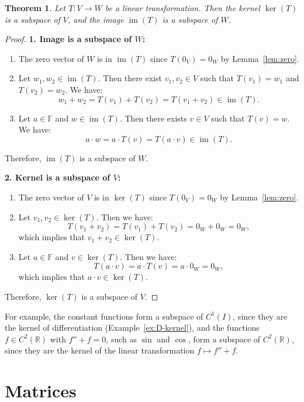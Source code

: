 \documentclass[11pt]{article}
\theoremstyle{definition}
\theoremstyle{plain}
\newtheorem{theorem}[definition]{Theorem}
\theoremstyle{remark}
\DeclareMathOperator{\im}{im}
\begin{document}
\begin{theorem}\label{thm:kerim}
    Let $T: V \to W$ be a linear transformation. Then the kernel $\ker(T)$ is a subspace of $V$, and the image $\im(T)$ is a subspace of $W$.
\end{theorem}

\begin{proof}
    \textbf{1. Image is a subspace of $W$:}
    \begin{enumerate}
        \item The zero vector of $W$ is in $\im(T)$ since $T(0_V) = 0_W$ by Lemma~\ref{lem:zero}.
        \item Let $w_1, w_2 \in \im(T)$. Then there exist $v_1, v_2 \in V$ such that $T(v_1) = w_1$ and $T(v_2) = w_2$. We have:
        \[w_1 + w_2 = T(v_1) + T(v_2) = T(v_1 + v_2) \in \im(T).\]
        \item Let $a \in \mathbb{F}$ and $w \in \im(T)$. Then there exists $v \in V$ such that $T(v) = w$. We have:
        \[a \cdot w = a \cdot T(v) = T(a \cdot v) \in \im(T).\]
    \end{enumerate}
    Therefore, $\im(T)$ is a subspace of $W$.

    \textbf{2. Kernel is a subspace of $V$:}
    \begin{enumerate}
        \item The zero vector of $V$ is in $\ker(T)$ since $T(0_V) = 0_W$ by Lemma~\ref{lem:zero}.
        \item Let $v_1, v_2 \in \ker(T)$. Then we have:
        \[T(v_1 + v_2) = T(v_1) + T(v_2) = 0_W + 0_W = 0_W,\]
        which implies that $v_1 + v_2 \in \ker(T)$.
        \item Let $a \in \mathbb{F}$ and $v \in \ker(T)$. Then we have:
        \[T(a \cdot v) = a \cdot T(v) = a \cdot 0_W = 0_W,\]
        which implies that $a \cdot v \in \ker(T)$.
    \end{enumerate}
    Therefore, $\ker(T)$ is a subspace of $V$.
\end{proof}

For example, the constant functions form a subspace of $C^1(I)$, since they are the kernel of differentiation (Example~\ref{ex:D-kernel}), and the functions $f \in C^2(\mathbb{R})$ with $f'' + f = 0$, such as $\sin$ and $\cos$, form a subspace of $C^2(\mathbb{R})$, since they are the kernel of the linear transformation $f \mapsto f'' + f$.

\section{Matrices}
\end{document}
